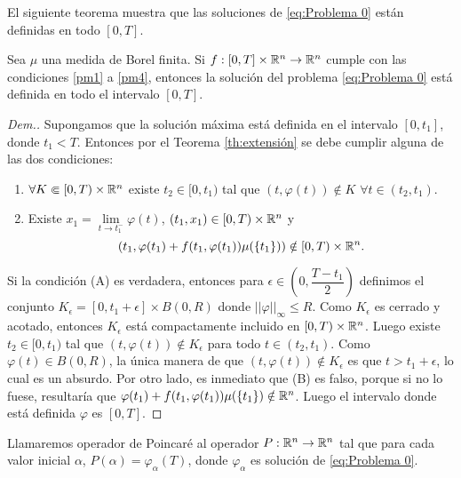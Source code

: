 El siguiente teorema muestra que las soluciones de \eqref{eq:Problema 0}  están definidas en todo $[0,T]$.

 
 \begin{thm}\label{th:P(T)}
 	Sea $\mu$ una medida de Borel finita.   Si $f:[0,T]\times \mathbb{R}^n\to\mathbb{R}^n$  cumple con las condiciones \ref{pm1}  a \ref{pm4},  entonces la solución del problema \eqref{eq:Problema 0} está definida en todo el intervalo $[0,T]$.
 \end{thm}
 \begin{proof}[Dem.]
 	Supongamos que la solución máxima está definida en el intervalo $[0,t_1]$, donde $t_1< T$. Entonces por el Teorema  \ref{th:extensión} se debe cumplir alguna de las dos condiciones:
 	\begin{enumerate}
 		\item[A)] 	$\forall K\Subset [0,T)\times\mathbb{R}^n$ existe $t_2\in [0,t_1)$ tal que $(t,\varphi(t))\notin K$   $\forall t\in(t_2,t_1)$. 

        \item[B)] Existe $x_1=\lim\limits_{t\to t_1^-}\varphi(t)$,  $(t_1,x_1)\in[0,T)\times\mathbb{R}^n$ y  $$\left( t_1 , \varphi(t_1)+f(t_1,\varphi(t_1))\mu(\{t_1\})\right) \notin [0,T)\times\mathbb{R}^n.$$
\end{enumerate}


   
 Si la condición (A) es verdadera, entonces para
 		$\epsilon\in\left( 0,\dfrac{T-t_1}{2}\right)$ 
    definimos el conjunto $K_{\epsilon}=[0,t_1+\epsilon]\times B(0,R)$ donde $||\varphi||_\infty\leq R$. Como $K_{\epsilon}$ es cerrado y acotado, entonces $K_{\epsilon}$ está compactamente incluido en $[0,T)\times\mathbb{R}^n$. Luego existe $t_2\in [0,t_1)$ tal que $(t,\varphi(t))\notin K_{\epsilon}$ para todo $t\in(t_2,t_1)$.  Como $\varphi(t)\in B(0,R)$, la única manera de que  $(t,\varphi(t))\notin K_{\epsilon}$ es que  $t>t_1+\epsilon$, lo cual es un absurdo. Por otro lado, es inmediato que  (B) es falso,  porque si no lo fuese, resultaría que $\varphi(t_1)+f(t_1,\varphi(t_1))\mu(\{t_1\})\notin\mathbb{R}^n$. Luego el intervalo donde está definida $\varphi$ es $[0,T]$.
 \end{proof}


\begin{defi} \label{def:op-poincare}
 Llamaremos operador de Poincaré  al operador $P:\mathbb{R}^n\to \mathbb{R}^n$ tal que para cada valor inicial $\alpha$, $P(\alpha)=\varphi_\alpha(T)$,  donde $\varphi_\alpha$ es solución de \eqref{eq:Problema 0}.
\end{defi}

